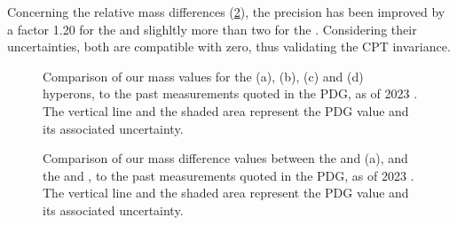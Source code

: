 Concerning the relative mass differences (\figs\ref{fig:MassDiffVsPDG}), the precision has been improved by a factor 1.20 for the \rmXiPM and slighltly more than two for the \rmOmegaPM. Considering their uncertainties, both are compatible with zero, thus validating the CPT invariance.

\begin{figure}[h]
\hspace*{-2cm}
\hspace*{-2cm}
\caption{Comparison of our mass values for the \rmXiM (a), \rmAxiP (b), \rmOmegaM (c) and \rmAomegaP (d) hyperons, to the past measurements quoted in the PDG, as of 2023 \cite{particledatagroupReviewParticlePhysics2022}. The vertical line and the shaded area represent the PDG value and its associated uncertainty.}
	\label{fig:MassVsPDG}
\end{figure}

\begin{figure}[h]
\hspace*{-2cm}
\caption{Comparison of our mass difference values between the \rmXiM and \rmAxiP (a), and the \rmOmegaM and \rmAomegaP, to the past measurements quoted in the PDG, as of 2023 \cite{particledatagroupReviewParticlePhysics2022}. The vertical line and the shaded area represent the PDG value and its associated uncertainty.}
	\label{fig:MassDiffVsPDG}
\end{figure}
